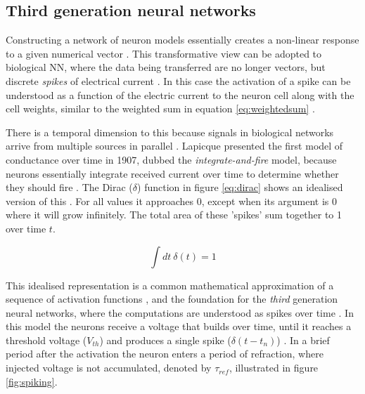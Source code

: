 \documentclass[report.tex]{subfiles}
\begin{document}
\subsection{Third generation neural networks}
Constructing a network of neuron models essentially creates a non-linear
response to a given numerical vector \cite{Russel2007}.
This transformative view can be adopted to biological \gls{NN}, where
the data being transferred are no longer vectors, but discrete
\textit{spikes} of electrical current \cite[p. 32]{Dayan2001, Eliasmith2004}.
In this case the activation of a spike can be understood as a function
of the electric current to the neuron cell along with the cell weights,
similar to the weighted sum in equation \ref{eq:weightedsum}
\cite[p. 234]{Dayan2001}.

There is a temporal dimension to this because signals in biological 
networks arrive from multiple sources in parallel \cite{Eliasmith2004}.
Lapicque presented the first model of conductance over time in 1907,
dubbed the \textit{integrate-and-fire} model, because neurons essentially
integrate received current over time to determine whether they should fire 
\cite{Dayan2001, Eliasmith2004}.
The Dirac ($\delta$) function in figure \ref{eq:dirac} shows an idealised
version of this \cite[p. 404]{Dayan2001}.
For all values it approaches 0, except when its argument is
0 where it will grow infinitely.
The total area of these 'spikes' sum together to 1 over time $t$.

\begin{equation} \label{eq:dirac}
\int dt\ \delta(t) = 1
\end{equation}

This idealised representation is a common mathematical approximation of
a sequence of activation functions \cite{Dayan2001, Eliasmith2004},
and the foundation for the \textit{third} generation
neural networks, where the computations are understood as spikes over
time \cite{Maass1997}.
In this model the neurons receive a voltage that builds over time, until
it reaches a threshold voltage ($V_{th}$) and produces a single spike
\mbox{($\delta(t-t_n)$)}
\cite{Dayan2001, Eliasmith2004}.
In a brief period after the activation the neuron enters a period of
refraction, where injected voltage is not accumulated, denoted by 
$\tau_{ref}$, illustrated in figure \ref{fig:spiking}.
\end{document}
